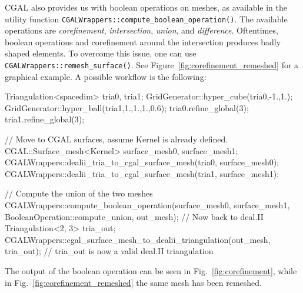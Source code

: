 \documentclass{ansarticle-preprint}
\begin{document}
CGAL also provides us with boolean operations on meshes, as available in the
utility function
\texttt{CGALWrappers::\allowbreak{}compute\_boolean\_operation()}. The
available operations are \textit{corefinement}, \textit{intersection},
\textit{union}, and \textit{difference}. Oftentimes, boolean
operations and corefinement around the intersection produces
badly shaped elements. To overcome this issue, one can use \texttt{CGALWrappers::\allowbreak{}remesh\_surface()}. See Figure~\ref{fig:corefinement_remeshed} for a graphical example.
A possible workflow is the following:
\begin{c++}
  Triangulation<spacedim> tria0, tria1;
  GridGenerator::hyper_cube(tria0,-1.,1.);
  GridGenerator::hyper_ball(tria1,{1.,1.,1.},0.6);
  tria0.refine_global(3);
  tria1.refine_global(3);

  // Move to CGAL surfaces, assume Kernel is already defined. 
  CGAL::Surface_mesh<Kernel> surface_mesh0, surface_mesh1;
  CGALWrappers::dealii_tria_to_cgal_surface_mesh(tria0, surface_mesh0);
  CGALWrappers::dealii_tria_to_cgal_surface_mesh(tria1, surface_mesh1);
  
  // Compute the union of the two meshes
  CGALWrappers::compute_boolean_operation(surface_mesh0,
                            surface_mesh1,
                            BooleanOperation::compute_union,
                            out_mesh);
  // Now back to deal.II
  Triangulation<2, 3>     tria_out;
  CGALWrappers::cgal_surface_mesh_to_dealii_triangulation(out_mesh, tria_out);
  // tria_out is now a valid deal.II triangulation
  \end{c++}
  The output of the boolean operation can be seen in Fig.~\ref{fig:corefinement}, while in Fig.~\ref{fig:corefinement_remeshed}
  the same mesh has been remeshed.
\end{document}
